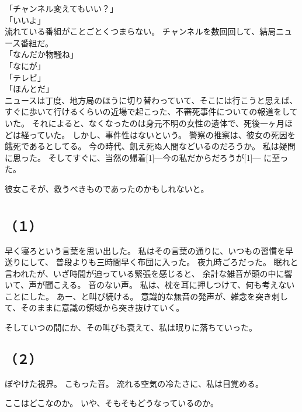 \documentclass[../IHMain]{subfiles}
\begin{document}
「チャンネル変えてもいい？」\\
「いいよ」\\
流れている番組がことごとくつまらない。
チャンネルを数回回して、結局ニュース番組だ。\\
「なんだか物騒ね」\\
「なにが」\\
「テレビ」\\
「ほんとだ」\\
ニュースは丁度、地方局のほうに切り替わっていて、そこには行こうと思えば、
すぐに歩いて行けるくらいの近場で起こった、不審死事件についての報道をしていた。
それによると、なくなったのは身元不明の女性の遺体で、死後一ヶ月ほどは経っていた。
しかし、事件性はないという。
警察の推察は、彼女の死因を餓死であるとしてる。
今の時代、飢え死ぬ人間などいるのだろうか。
私は疑問に思った。
そしてすぐに、当然の帰着\scalebox{3}[1]{―}今の私だからだろうが\scalebox{3}[1]{―}
に至った。

彼女こそが、救うべきものであったのかもしれないと。

\section{}
\subsection*{（１）}
早く寝ろという言葉を思い出した。
私はその言葉の通りに、いつもの習慣を早送りにして、
普段よりも三時間早く布団に入った。
夜九時ごろだった。
眠れと言われたが、いざ時間が迫っている緊張を感じると、
余計な雑音が頭の中に響いて、声が聞こえる。
音のない声。
私は、枕を耳に押しつけて、何も考えないことにした。
あー、と叫び続ける。
意識的な無音の発声が、雑念を突き刺して、そのままに意識の領域から突き抜けていく。

そしていつの間にか、その叫びも衰えて、私は眠りに落ちていった。

\subsection*{（２）}
ぼやけた視界。
こもった音。
流れる空気の冷たさに、私は目覚める。

ここはどこなのか。
いや、そもそもどうなっているのか。
\end{document}
